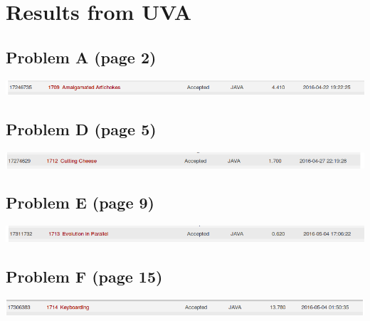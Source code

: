 \documentclass[12pt]{article}
\begin{document}

\newcommand{\hmwkClass}{COS 255}
\newcommand{\hmwkSemester}{Spring 2016}

\newcommand{\hmwkAuthorName}{Lukas Leung}
\newcommand{\hmwkAuthorID}{lleung}

\newcommand{\hmwkAssignmentNum}{9}

\newcommand{\hmwkProblemNum}{0}

\newcommand{\hmwkCollaborators}{}
\thispagestyle{fancycollab}

\section*{Results from UVA}
\subsection{Problem A (page 2)}
\includegraphics[width=\textwidth]{ProblemA}
\subsection{Problem D (page 5)}
\includegraphics[width=\textwidth]{ProblemD}
\subsection{Problem E (page 9)}
\includegraphics[width=\textwidth]{ProblemE}
\subsection{Problem F (page 15)}
\includegraphics[width=\textwidth]{ProblemF}
\newpage
\end{document}
